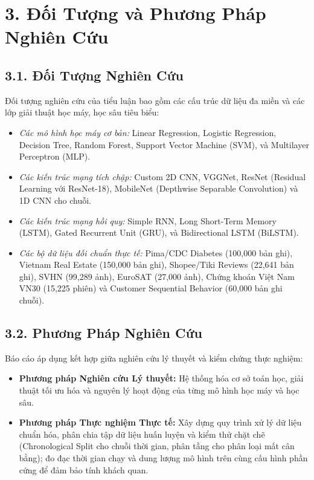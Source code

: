 \documentclass[12pt,a4paper]{report}
\begin{document}
\section*{3. Đối Tượng và Phương Pháp Nghiên Cứu}

\subsection*{3.1. Đối Tượng Nghiên Cứu}
Đối tượng nghiên cứu của tiểu luận bao gồm các cấu trúc dữ liệu đa miền và các lớp giải thuật học máy, học sâu tiêu biểu:
\begin{itemize}[leftmargin=1.2cm]
    \item \textit{Các mô hình học máy cơ bản:} Linear Regression, Logistic Regression, Decision Tree, Random Forest, Support Vector Machine (SVM), và Multilayer Perceptron (MLP).
    \item \textit{Các kiến trúc mạng tích chập:} Custom 2D CNN, VGGNet, ResNet (Residual Learning với ResNet-18), MobileNet (Depthwise Separable Convolution) và 1D CNN cho chuỗi.
    \item \textit{Các kiến trúc mạng hồi quy:} Simple RNN, Long Short-Term Memory (LSTM), Gated Recurrent Unit (GRU), và Bidirectional LSTM (BiLSTM).
    \item \textit{Các bộ dữ liệu đối chuẩn thực tế:} Pima/CDC Diabetes (100,000 bản ghi), Vietnam Real Estate (150,000 bản ghi), Shopee/Tiki Reviews (22,641 bản ghi), SVHN (99,289 ảnh), EuroSAT (27,000 ảnh), Chứng khoán Việt Nam VN30 (15,225 phiên) và Customer Sequential Behavior (60,000 bản ghi chuỗi).
\end{itemize}

\subsection*{3.2. Phương Pháp Nghiên Cứu}
Báo cáo áp dụng kết hợp giữa nghiên cứu lý thuyết và kiểm chứng thực nghiệm:
\begin{itemize}[leftmargin=1.2cm]
    \item \textbf{Phương pháp Nghiên cứu Lý thuyết:} Hệ thống hóa cơ sở toán học, giải thuật tối ưu hóa và nguyên lý hoạt động của từng mô hình học máy và học sâu.
    \item \textbf{Phương pháp Thực nghiệm Thực tế:} Xây dựng quy trình xử lý dữ liệu chuẩn hóa, phân chia tập dữ liệu huấn luyện và kiểm thử chặt chẽ (Chronological Split cho chuỗi thời gian, phân tầng cho phân loại mất cân bằng); đo đạc thời gian chạy và dung lượng mô hình trên cùng cấu hình phần cứng để đảm bảo tính khách quan.
\end{itemize}
\end{document}

